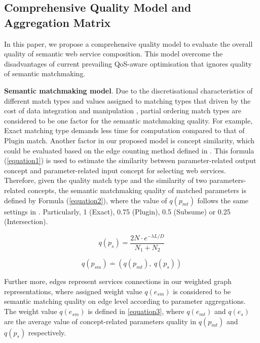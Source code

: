 \documentclass{IEEEtran}
\begin{document}
\subsection{Comprehensive Quality Model and Aggregation Matrix}\label{qualityModel}
In this paper, we propose a comprehensive quality model to evaluate the overall quality of semantic web service composition. This model overcome the disadvantages of current prevailing QoS-aware optimisation that ignores quality of semantic matchmaking.

\textbf{Semantic matchmaking model}. Due to the discretisational characteristics of different match types and values assigned to matching types that driven by the cost of data integration and manipulation \cite{lecue2009optimizing}, partial ordering match types are considered to be one factor for the semantic matchmaking quality. For example, Exact matching type demands less time for computation compared to that of Plugin match. Another factor in our proposed model is concept similarity, which could be evaluated based on the edge counting method defined in \cite{shet2012new}. This formula (\ref{equation1}) is used to estimate the similarity between parameter-related output concept and parameter-related input concept for selecting web services. Therefore, given the quality match type and the similarity of two parameters-related concepts, the semantic matchmaking quality of matched parameters is defined by Formula (\ref{equation2}), where the value of $q(p_ {mt})$ follows the same settings in \cite{lecue2009optimizing}. Particularly, 1 (Exact), 0.75 (Plugin), 0.5 (Subsume) or 0.25 (Intersection). 

\begin{equation}
q(p_ {s}){=} \frac{2N \cdot e^{-\lambda L/D} }{N_{1}+N_{2}}
\label{equation1}
\end{equation}

\begin{equation}
\label{equation2}
q(p_{sm}) \stackrel{.}{=} (q(p_ {mt}), \  q(p_ {s}))
\end{equation}

Further more, edges represent services connections in our weighted graph representations, where assigned weight value $q(e_{sm})$ is considered to be semantic matching quality on edge level according to parameter aggregations. The weight value $q(e_{sm})$ is defined in \ref{equation3}, where $q(e_ {mt})$ and $q(e_ {s})$ are the average value of concept-related parameters quality in $q(p_{mt})$ and $q(p_{s})$ respectively. 
\end{document}
